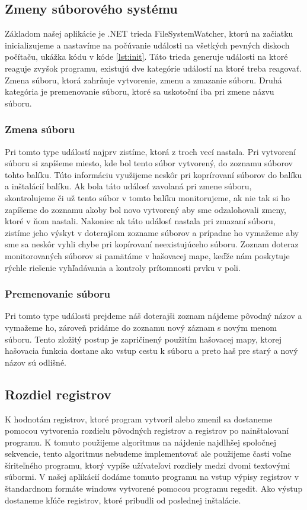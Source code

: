 \subsection{Zmeny súborového systému}
Základom našej aplikácie je .NET trieda FileSystemWatcher, ktorú na začiatku inicializujeme a nastavíme na počúvanie události na všetkých pevných diskoch počítaču, ukážka kódu v kóde \ref{lst:init}. Táto trieda generuje události na ktoré reaguje zvyšok programu, existujú dve kategórie událostí na ktoré treba reagovať. Zmena súboru, ktorá zahrňuje vytvorenie, zmenu a zmazanie súboru. Druhá kategória je premenovanie súboru, ktoré sa uskotoční iba pri zmene názvu súboru. 

\subsubsection{Zmena súboru}
Pri tomto type událostí najprv zistíme, ktorá z troch vecí nastala. Pri vytvorení súboru si zapíšeme miesto, kde bol tento súbor vytvorený, do zoznamu súborov tohto balíku. Túto informáciu využijeme neskôr pri koprírovaní súborov do balíku a inštalácií balíku. Ak bola táto událosť zavolaná pri zmene súboru, skontrolujeme či už tento súbor v tomto balíku monitorujeme, ak nie tak si ho zapíšeme do zoznamu akoby bol novo vytvorený aby sme odzalohovali zmeny, ktoré v ňom nastali. Nakoniec ak táto událosť nastala pri zmazaní súboru, zistíme jeho výskyt v doterajšom zozname súborov a prípadne ho vymažeme aby sme sa neskôr vyhli chybe pri kopírovaní neexistujúceho súboru. Zoznam doteraz monitorovaných súborov si pamätáme v hašovacej mape, keďže nám poskytuje rýchle riešenie vyhľadávania a kontroly prítomnosti prvku v poli.

\subsubsection{Premenovanie súboru}
Pri tomto type události prejdeme náš doterajši zoznam nájdeme pôvodný názov a vymažeme ho, zároveň pridáme do zoznamu nový záznam s novým menom súboru. Tento zložitý postup je zapričinený použitím hašovacej mapy, ktorej hašovacia funkcia dostane ako vstup cestu k súboru a preto haš pre starý a nový názov sú odlišné.

\subsection{Rozdiel registrov}
K hodnotám registrov, ktoré program vytvoril alebo zmenil sa dostaneme pomocou vytvorenia rozdielu pôvodných registrov a registrov po nainštalovaní programu. K tomuto použijeme algoritmus na nájdenie najdlhšej spoločnej sekvencie, tento algoritmus nebudeme implementovať ale použijeme časti voľne šíriteľného programu, ktorý vypíše užívateľovi rozdiely medzi dvomi textovými súbormi. V našej aplikácií dodáme tomuto programu na vstup výpisy registrov v štandardnom formáte windows vytvorené pomocou programu regedit. Ako výstup dostaneme kľúče registrov, ktoré pribudli od poslednej inštalácie.

